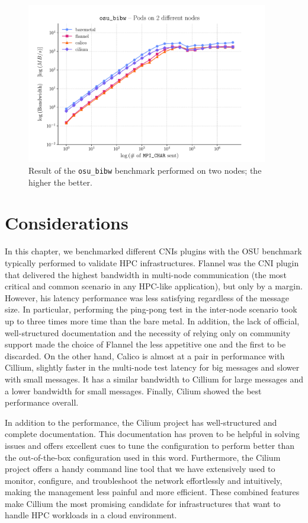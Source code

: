 \begin{figure}[H]
  \centering
  \includegraphics[width=0.94\textwidth]{img/chpt3/bibw-2-nodes}
  \caption{Result of the \texttt{osu\_bibw} benchmark performed on two nodes; the
    higher the better.}
  \label{fig:bibw-2-nodes}
\end{figure}

\section{Considerations}\label{sec:final-considerations}

In this chapter, we benchmarked different CNIs plugins with the OSU benchmark
typically performed to validate HPC infrastructures.
Flannel was the CNI plugin that delivered the highest bandwidth in multi-node
communication (the most critical and common scenario in any HPC-like
application), but only by a margin.
However, his latency performance was less satisfying regardless of the message
size.
In particular, performing the ping-pong test in the inter-node scenario took up
to three times more time than the bare metal.
In addition, the lack of official, well-structured documentation and the
necessity of relying only on community support made the choice of Flannel the
less appetitive one and the first to be discarded.
On the other hand, Calico is almost at a pair in performance with Cillium,
slightly faster in the multi-node test latency for big messages and slower with
small messages.
It has a similar bandwidth to Cillium for large messages and a lower bandwidth
for small messages.
Finally, Cilium showed the best performance overall.

In addition to the performance, the Cilium project has well-structured and
complete documentation. This documentation has proven to be helpful in solving
issues and offers excellent cues to tune the configuration to perform better
than the out-of-the-box configuration used in this word. Furthermore, the Cilium
project offers a handy command line tool that we have extensively used to
monitor, configure, and troubleshoot the network effortlessly and intuitively,
making the management less painful and more efficient. These combined features
make Cillium the most promising candidate for infrastructures that want to
handle HPC workloads in a cloud environment.

